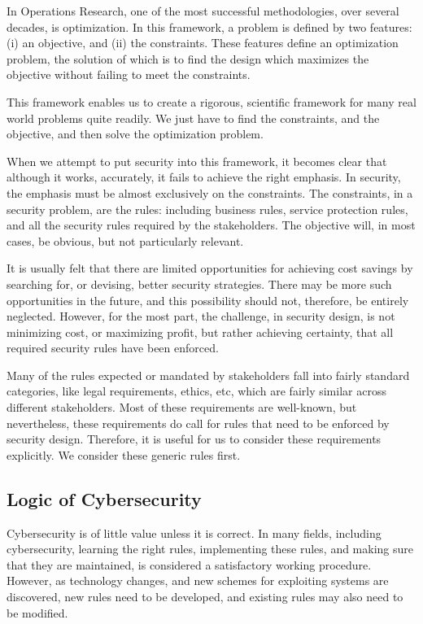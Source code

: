 In Operations Research, one of the most successful methodologies, over several decades, is optimization. In this framework, a problem is defined by two features: (i) an objective, and (ii) the constraints. These features define an optimization problem, the solution of which is to find the design which maximizes the objective without failing to meet the constraints.

This framework enables us to create a rigorous, scientific framework for many real world problems quite readily. We just have to find the constraints, and the objective, and then solve the optimization problem.


When we attempt to put security into this framework, it becomes clear that although it works, accurately, it fails to achieve the right emphasis. In security, the emphasis must be almost exclusively on the constraints. The constraints, in a security problem, are the rules: including business rules, service protection rules, and all the security rules required by the stakeholders. The objective will, in most cases, be obvious, but not particularly relevant.

It is usually felt that there are limited opportunities for achieving cost savings by searching for, or devising, better security strategies. There may be more such opportunities in the future, and this possibility should not, therefore, be entirely neglected. However, for the most part, the challenge, in security design, is not minimizing cost, or maximizing profit, but rather achieving certainty, that all required security rules have been enforced.

Many of the rules expected or mandated by stakeholders fall into fairly standard categories, like legal requirements, ethics, etc, which are fairly similar across different stakeholders. Most of these 
 requirements are well-known, but nevertheless, these requirements do call for rules that need to be enforced by security design. Therefore, it is useful for us to consider these requirements explicitly. We consider these generic rules first.

\subsection{Logic of Cybersecurity}
 
Cybersecurity is of little value unless it is correct. In many fields,
including cybersecurity, learning the right rules, implementing
these rules, and making sure that they are maintained, is considered
a satisfactory working procedure. However, as technology changes, and
new schemes for exploiting systems are discovered, new rules need to be
developed, and existing rules may also need to be modified.

